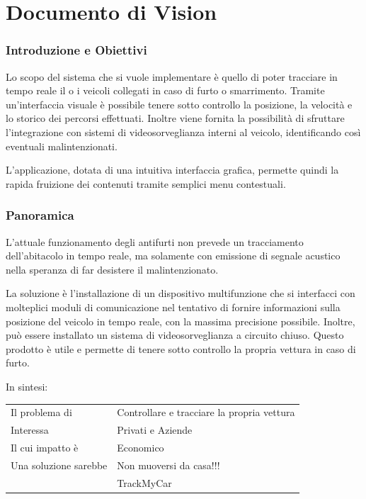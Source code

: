 \documentclass[a4paper,12pt]{beamer}
\begin{document}
\pagebreak

\section{Documento di Vision}
\begin{frame}
\frametitle{Introduzione e Obiettivi}
Lo scopo del sistema che si vuole implementare è quello di poter tracciare in tempo reale il o i veicoli collegati in caso di furto o smarrimento. Tramite un'interfaccia visuale è possibile tenere sotto controllo la posizione, la velocità e lo storico dei percorsi effettuati. Inoltre viene fornita la possibilità di sfruttare l'integrazione con sistemi di videosorveglianza interni al veicolo, identificando così eventuali malintenzionati. 

L'applicazione, dotata di una intuitiva interfaccia grafica, permette quindi la rapida fruizione dei contenuti tramite semplici menu contestuali.
\end{frame}

\begin{frame}
\frametitle{Panoramica}
L'attuale funzionamento degli antifurti non prevede un tracciamento dell'abitacolo in tempo reale, ma solamente con emissione di segnale acustico nella speranza di far desistere il malintenzionato. 

La soluzione è l'installazione di un dispositivo multifunzione che si interfacci con molteplici moduli di comunicazione nel tentativo di fornire informazioni sulla posizione del veicolo in tempo reale, con la massima precisione possibile. Inoltre, può essere installato un sistema di videosorveglianza a circuito chiuso.
Questo prodotto è utile e permette di tenere sotto controllo la propria vettura in caso di furto.
\end{frame}

\begin{frame}
\begin{table}[h]
In sintesi:
\begin{center}
\begin{tabular}{p{4 cm}  p{5 cm}}
\hline	
Il problema di & Controllare e tracciare la propria vettura \\
Interessa & Privati e Aziende \\ 
Il cui impatto è & Economico \\ 
Una soluzione sarebbe & Non muoversi da casa!!!  \\ 
& TrackMyCar \\ \hline
\end{tabular}
\end{center}
\end{table}
\end{frame}
\end{document}
